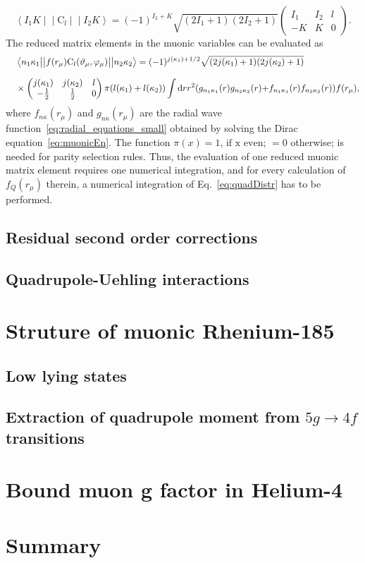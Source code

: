 \begin{equation}
\left< I_1K\middle|\middle|\text{C}_l\middle|\middle|I_2K\right>=(-1)^{I_2+K}
\sqrt{(2I_1+1)(2I_2+1)}
\left(
\begin{matrix}
I_1&I_2&l\\
-K&K&0
\end{matrix}
\right).
\end{equation}
The reduced matrix elements in the muonic variables can be evaluated as~\cite{johnson2007}
\begin{alignat}{2}
&&&\left< n_1\kappa_1\big{|}\big{|}f(r_\mu)\text{C}_l(\vartheta_\mu,\varphi_\mu) \big{|}\big{|}n_2\kappa_2\right> =  
 (-1)^{j(\kappa_1)+1/2} \sqrt{(2j(\kappa_1)+1)(2j(\kappa_2)+1)}
\notag\\[7.5pt]
&&&\times
\left(
\begin{matrix}
j(\kappa_1)&j(\kappa_2)&l\\
-\frac{1}{2}&\frac{1}{2}&0
\end{matrix}
\right)\pi(l(\kappa_1)+l(\kappa_2))\int \text{d}rr^2 ({g_{n_1\kappa_1}(r)g_{n_2\kappa_2}(r)}{+}{f_{n_1\kappa_1}(r)f_{n_2\kappa_2}(r)}) f(r_\mu),
\end{alignat}
where $f_{n\kappa}(r_\mu)$ and $g_{n\kappa}(r_\mu)$ are the radial wave function~\eqref{eq:radial_equations_small} obtained by solving the Dirac equation~\eqref{eq:muonicEn}.
The function $\pi(x) = 1,\,\text{if x even}$; $=0$ otherwise; is needed for parity selection rules.
Thus, the evaluation of one reduced muonic matrix element requires one numerical integration, and for every calculation of $f_Q(r_\mu)$ therein, a numerical integration of Eq.~\eqref{eq:quadDistr} has to be performed.

\subsection{Residual second order corrections}
\label{sec:muon_residualSO}

\subsection{Quadrupole-Uehling interactions}
\label{sec:muon_quadUehl}

\section{Struture of muonic Rhenium-185}
\label{sec:muon_re}

\subsection{Low lying states}
\subsection{Extraction of quadrupole moment from $5g\rightarrow 4f$ transitions}



\section{Bound muon g factor in Helium-4}
\label{sec:muon_he}

\section{Summary}
\label{sec:muon_summary}
